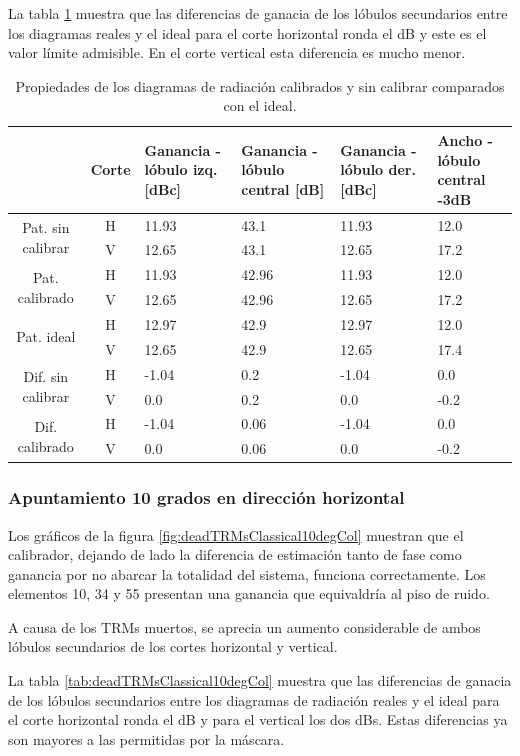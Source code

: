 La tabla \ref{tab:deadTRMsClassical0deg} muestra que las diferencias de ganacia de los lóbulos secundarios entre los diagramas 
reales y el ideal para el corte horizontal ronda el dB y  este es el valor límite admisible. En el corte vertical esta 
diferencia es mucho menor.

\begin{table}[H]
  \footnotesize
  \centering
  \begin{tabular}{|c|c|p{2cm}|p{2.5cm}|p{2.5cm}|p{2.5cm}|}
    \cline{2-6}
    \multicolumn{1}{c|}{} & Corte & Ganancia - lóbulo izq. [dBc] & Ganancia - lóbulo central [dB] &
    Ganancia - lóbulo der. [dBc] & Ancho - lóbulo central -3dB \tabularnewline\hline
    \multirow{2}{2cm}{Pat. sin calibrar} & H & 11.93 & 43.1 & 11.93 & 12.0 \tabularnewline\cline{2-6}
     & V & 12.65 & 43.1 & 12.65 & 17.2 \tabularnewline\hline
    \multirow{2}{2cm}{Pat. calibrado} & H & 11.93 & 42.96 & 11.93 & 12.0 \tabularnewline\cline{2-6}
     & V & 12.65 & 42.96 & 12.65 & 17.2 \tabularnewline\hline
    \multirow{2}{2cm}{Pat. ideal} & H & 12.97 & 42.9 & 12.97 & 12.0 \tabularnewline\cline{2-6}
     & V & 12.65 & 42.9 & 12.65 & 17.4 \tabularnewline\hline
    \multirow{2}{2cm}{Dif. sin calibrar} & H & -1.04 & 0.2 & -1.04 & 0.0\tabularnewline\cline{2-6}
     & V & 0.0 & 0.2 & 0.0 & -0.2 \tabularnewline\hline
    \multirow{2}{2cm}{Dif. calibrado} & H & -1.04 & 0.06 & -1.04 & 0.0 \tabularnewline\cline{2-6}
     & V & 0.0 & 0.06 & 0.0 & -0.2 \tabularnewline\hline
  \end{tabular}
  \caption{Propiedades de los diagramas de radiación calibrados y sin calibrar comparados con el ideal.}
  \label{tab:deadTRMsClassical0deg}
\end{table}


\subsubsection{Apuntamiento 10 grados en dirección horizontal}

Los gráficos de la figura \ref{fig:deadTRMsClassical10degCol} muestran que el calibrador, dejando de lado la diferencia de 
estimación tanto de fase como ganancia por no abarcar la totalidad del sistema, funciona correctamente. Los elementos 10, 34 y 
55 presentan una ganancia que equivaldría al piso de ruido.

A causa de los TRMs muertos, se aprecia un aumento considerable de ambos lóbulos secundarios de los cortes horizontal y vertical.

La tabla \ref{tab:deadTRMsClassical10degCol} muestra que las diferencias de ganacia de los lóbulos secundarios entre los 
diagramas de radiación reales y el ideal para el corte horizontal ronda el dB y para el vertical los dos dBs. Estas diferencias
ya son mayores a las permitidas por la máscara.

